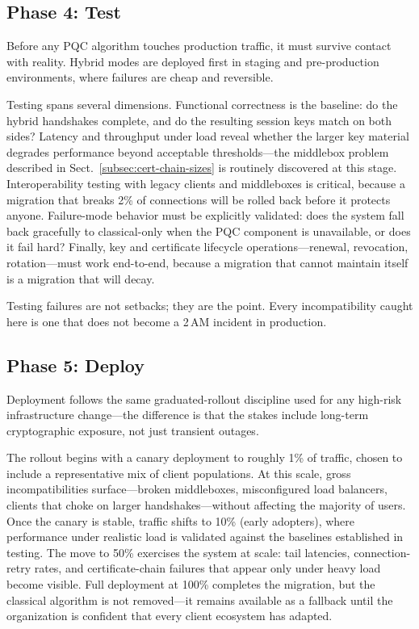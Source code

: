 \subsection{Phase 4: Test}
\label{subsec:phase-test}

Before any PQC algorithm touches production traffic, it must survive contact with reality.  Hybrid modes are deployed first in staging and pre-production environments, where failures are cheap and reversible.

Testing spans several dimensions.  Functional correctness is the baseline: do the hybrid handshakes complete, and do the resulting session keys match on both sides?  Latency and throughput under load reveal whether the larger key material degrades performance beyond acceptable thresholds---the middlebox problem described in Sect.~\ref{subsec:cert-chain-sizes} is routinely discovered at this stage.  Interoperability testing with legacy clients and middleboxes is critical, because a migration that breaks 2\% of connections will be rolled back before it protects anyone.  Failure-mode behavior must be explicitly validated: does the system fall back gracefully to classical-only when the PQC component is unavailable, or does it fail hard?  Finally, key and certificate lifecycle operations---renewal, revocation, rotation---must work end-to-end, because a migration that cannot maintain itself is a migration that will decay.

Testing failures are not setbacks; they are the point.  Every incompatibility caught here is one that does not become a 2\,AM incident in production.

\subsection{Phase 5: Deploy}
\label{subsec:phase-deploy}

Deployment follows the same graduated-rollout discipline used for any high-risk infrastructure change---the difference is that the stakes include long-term cryptographic exposure, not just transient outages.

The rollout begins with a canary deployment to roughly 1\% of traffic, chosen to include a representative mix of client populations.  At this scale, gross incompatibilities surface---broken middleboxes, misconfigured load balancers, clients that choke on larger handshakes---without affecting the majority of users.  Once the canary is stable, traffic shifts to 10\% (early adopters), where performance under realistic load is validated against the baselines established in testing.  The move to 50\% exercises the system at scale: tail latencies, connection-retry rates, and certificate-chain failures that appear only under heavy load become visible.  Full deployment at 100\% completes the migration, but the classical algorithm is not removed---it remains available as a fallback until the organization is confident that every client ecosystem has adapted.

